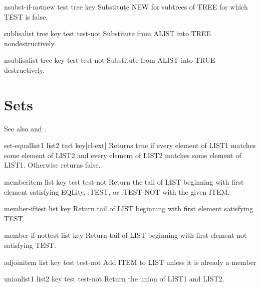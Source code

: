 \documentclass[10pt,english]{book}
\begin{document}
\begin{function}{nsubst-if-not}{new test tree \key key}
  Substitute NEW for subtrees of TREE for which TEST is false.
\end{function}

\begin{function}{sublis}{alist tree \key key test test-not}
  Substitute from ALIST into TREE nondestructively.
\end{function}

\begin{function}{nsublis}{alist tree \key key test test-not}
  Substitute from ALIST into TRUE destructively.
\end{function}

\section{Sets}
\label{sec:sets}

See also  and .

\begin{function}{set-equal}{list1 list2 \key test key}[cl-ext]
  Returns true if every element of LIST1 matches some element of LIST2 and
every element of LIST2 matches some element of LIST1. Otherwise returns false.
\end{function}

\begin{function}{member}{item list \key key test test-not}
  Return the tail of LIST beginning with first element satisfying EQLity,
   :TEST, or :TEST-NOT with the given ITEM.
\end{function}

\begin{function}{member-if}{test list \key key}
  Return tail of LIST beginning with first element satisfying TEST.
\end{function}

\begin{function}{member-if-not}{test list \key key}
  Return tail of LIST beginning with first element not satisfying TEST.
\end{function}

\begin{function}{adjoin}{item list \key key test test-not}
  Add ITEM to LIST unless it is already a member
\end{function}

\begin{function}{union}{list1 list2 \key key test test-not}
  Return the union of LIST1 and LIST2.
\end{function}
\end{document}
